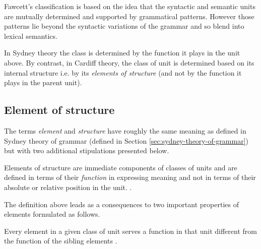 
Fawcett's classification is based on the idea that the syntactic and semantic units are mutually determined and supported by grammatical patterns. However those patterns lie beyond the syntactic variations of the grammar and so blend into lexical semantics.

In Sydney theory the class is determined by the function it plays in the unit above. By contrast, in Cardiff theory, the class of unit is determined based on its internal structure i.e. by its \textit{elements of structure} (and not by the function it plays in the parent unit).  

\subsection{Element of structure}
\label{sec:elements-of-structure}

The terms \textit{element} and \textit{structure} have roughly the same meaning as defined in Sydney theory of grammar (defined in Section \ref{sec:sydney-theory-of-grammar}) but with two additional stipulations presented below.

\begin{definition}\label{def:elementStructure}
	Elements of structure are immediate components of classes of units and are defined in terms of their \textit{function} in expressing meaning and not in terms of their absolute or relative position in the unit. \citep[213--214]{Fawcett2000}. 
\end{definition}

The definition above leads as a consequences to two important properties of elements formulated as follows.

\begin{generalization}
Every element in a given class of unit serves a function in that unit different from the function of the sibling elements \citep[214]{Fawcett2000}. 
\end{generalization} 

